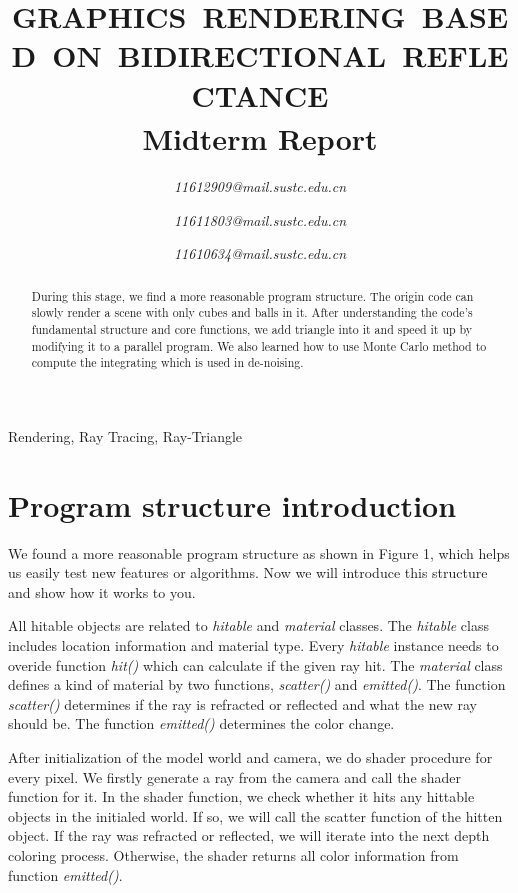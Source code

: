 \documentclass[10pt,conference,compsoc]{IEEEtran}
\begin{document}
	\title{GRAPHICS RENDERING BASED ON BIDIRECTIONAL REFLECTANCE\\
	{\footnotesize \textsuperscript{}Midterm Report}
	}
	
	\author{
	\textit{11612909@mail.sustc.edu.cn}
	\and
	\textit{11611803@mail.sustc.edu.cn}
	\and
	\textit{11610634@mail.sustc.edu.cn}
	}
	\maketitle
	\begin{abstract}
		 During this stage, we find a more reasonable program structure. The origin code can slowly render a scene with only cubes and balls in it.  After understanding the code's fundamental structure and core functions, we add triangle into it and speed it up by modifying it to a parallel program. We also learned how to use Monte Carlo method to compute the integrating which is used in de-noising.
	\end{abstract}

	\begin{IEEEkeywords}
		Rendering, Ray Tracing, Ray-Triangle
	\end{IEEEkeywords}
	
	\section{Program structure introduction}
	We found a more reasonable program structure \cite{oneweekend} as shown in Figure 1, which helps us easily test new features or algorithms. Now we will introduce this structure and show how it works to you.
	
	All hitable objects are related to \textit{hitable} and \textit{material} classes. The  \textit{hitable} class includes location information and material type. Every \textit{hitable} instance needs to overide function \textit{hit()} which can  calculate if the given ray hit. The  \textit{material} class defines a kind of material by two functions, \textit{scatter()} and \textit{emitted()}. The function \textit{scatter()} determines if the ray is refracted or reflected and what the new ray should be. The function \textit{emitted()} determines the color change.
	
	After initialization of the model world and camera, we do shader procedure for every pixel. We firstly generate a ray from the camera and call the shader function for it. In the shader function, we check whether it hits any hittable objects in the initialed world. If so, we will call the scatter function of the hitten object. If the ray was refracted or reflected, we will iterate into the next depth coloring process. Otherwise, the shader returns all color information from function \textit{emitted()}.
	
\end{document}
